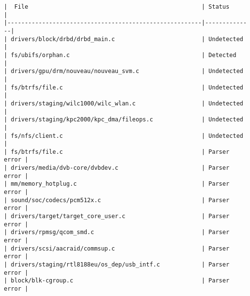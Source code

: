 \begin{verbatim}
|  File                                                  | Status       | 
|--------------------------------------------------------|--------------|
| drivers/block/drbd/drbd_main.c                         | Undetected   | 
| fs/ubifs/orphan.c                                      | Detected     | 
| drivers/gpu/drm/nouveau/nouveau_svm.c                  | Undetected   | 
| fs/btrfs/file.c                                        | Undetected   | 
| drivers/staging/wilc1000/wilc_wlan.c                   | Undetected   | 
| drivers/staging/kpc2000/kpc_dma/fileops.c              | Undetected   | 
| fs/nfs/client.c                                        | Undetected   | 
| fs/btrfs/file.c                                        | Parser error | 
| drivers/media/dvb-core/dvbdev.c                        | Parser error | 
| mm/memory_hotplug.c                                    | Parser error | 
| sound/soc/codecs/pcm512x.c                             | Parser error | 
| drivers/target/target_core_user.c                      | Parser error | 
| drivers/rpmsg/qcom_smd.c                               | Parser error | 
| drivers/scsi/aacraid/commsup.c                         | Parser error | 
| drivers/staging/rtl8188eu/os_dep/usb_intf.c            | Parser error | 
| block/blk-cgroup.c                                     | Parser error | 
\end{verbatim}